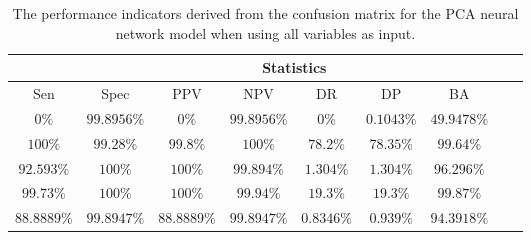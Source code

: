 \begin{table}[!ht]
	\centering
	\begin{tabular}{|c|c|c|c|c|c|c|c|c|}
		\hline
		 & \multicolumn{7}{c|}{Statistics} \\ \hline
		Sen & Spec & PPV & NPV & DR & DP & BA \\ \hline
		$0\%$ & $99.8956\%$ & $0\%$ & $99.8956\%$ & $0\%$ & $0.1043\%$ & $49.9478\%$ \\ \hline
		$100\%$ & $99.28\%$ & $99.8\%$ & $100\%$ & $78.2\%$ & $78.35\%$ & $99.64\%$ \\ \hline
		$92.593\%$ & $100\%$ & $100\%$ & $99.894\%$ & $1.304\%$ & $1.304\%$ & $96.296\%$ \\ \hline
		$99.73\%$ & $100\%$ & $100\%$ & $99.94\%$ & $19.3\%$ & $19.3\%$ & $99.87\%$ \\ \hline
		$88.8889\%$ & $99.8947\%$ & $88.8889\%$ & $99.8947\%$ & $0.8346\%$ & $0.939\%$ & $94.3918\%$ \\ \hline
	\end{tabular}
	\caption{The performance indicators derived from the confusion matrix for the PCA neural network model when using all variables as input.}
	\label{tab:cs:all:pcaNNet}
\end{table}
